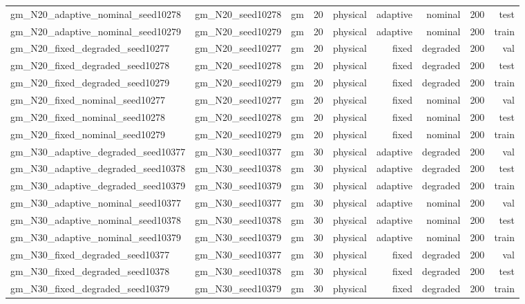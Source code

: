 \begin{tabular}{lrrrrrrrr}
gm\_N20\_adaptive\_nominal\_seed10278 & gm\_N20\_seed10278 & gm & 20 & physical & adaptive & nominal & 200 & test \\
gm\_N20\_adaptive\_nominal\_seed10279 & gm\_N20\_seed10279 & gm & 20 & physical & adaptive & nominal & 200 & train \\
gm\_N20\_fixed\_degraded\_seed10277 & gm\_N20\_seed10277 & gm & 20 & physical & fixed & degraded & 200 & val \\
gm\_N20\_fixed\_degraded\_seed10278 & gm\_N20\_seed10278 & gm & 20 & physical & fixed & degraded & 200 & test \\
gm\_N20\_fixed\_degraded\_seed10279 & gm\_N20\_seed10279 & gm & 20 & physical & fixed & degraded & 200 & train \\
gm\_N20\_fixed\_nominal\_seed10277 & gm\_N20\_seed10277 & gm & 20 & physical & fixed & nominal & 200 & val \\
gm\_N20\_fixed\_nominal\_seed10278 & gm\_N20\_seed10278 & gm & 20 & physical & fixed & nominal & 200 & test \\
gm\_N20\_fixed\_nominal\_seed10279 & gm\_N20\_seed10279 & gm & 20 & physical & fixed & nominal & 200 & train \\
gm\_N30\_adaptive\_degraded\_seed10377 & gm\_N30\_seed10377 & gm & 30 & physical & adaptive & degraded & 200 & val \\
gm\_N30\_adaptive\_degraded\_seed10378 & gm\_N30\_seed10378 & gm & 30 & physical & adaptive & degraded & 200 & test \\
gm\_N30\_adaptive\_degraded\_seed10379 & gm\_N30\_seed10379 & gm & 30 & physical & adaptive & degraded & 200 & train \\
gm\_N30\_adaptive\_nominal\_seed10377 & gm\_N30\_seed10377 & gm & 30 & physical & adaptive & nominal & 200 & val \\
gm\_N30\_adaptive\_nominal\_seed10378 & gm\_N30\_seed10378 & gm & 30 & physical & adaptive & nominal & 200 & test \\
gm\_N30\_adaptive\_nominal\_seed10379 & gm\_N30\_seed10379 & gm & 30 & physical & adaptive & nominal & 200 & train \\
gm\_N30\_fixed\_degraded\_seed10377 & gm\_N30\_seed10377 & gm & 30 & physical & fixed & degraded & 200 & val \\
gm\_N30\_fixed\_degraded\_seed10378 & gm\_N30\_seed10378 & gm & 30 & physical & fixed & degraded & 200 & test \\
gm\_N30\_fixed\_degraded\_seed10379 & gm\_N30\_seed10379 & gm & 30 & physical & fixed & degraded & 200 & train \\

\end{tabular}
